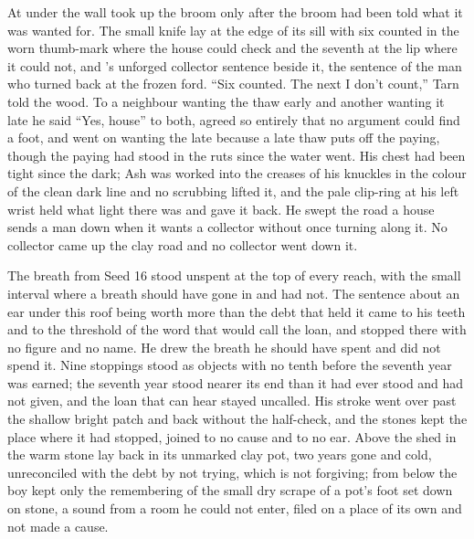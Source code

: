 At  under the wall  took up the broom only after the broom had been told what it was wanted for. The small knife lay at the edge of its sill with six counted in the worn thumb-mark where the house could check and the seventh at the lip where it could not, and 's unforged collector sentence beside it, the sentence of the man who turned back at the frozen ford. “Six counted. The next I don't count,” Tarn told the wood. To a neighbour wanting the thaw early and another wanting it late he said “Yes, house” to both, agreed so entirely that no argument could find a foot, and went on wanting the late because a late thaw puts off the paying, though the paying had stood in the ruts since the water went. His chest had been tight since the dark; Ash was worked into the creases of his knuckles in the colour of the clean dark line and no scrubbing lifted it, and the pale clip-ring at his left wrist held what light there was and gave it back. He swept the road a house sends a man down when it wants a collector without once turning along it. No collector came up the clay road and no collector went down it.

The breath from Seed 16 stood unspent at the top of every reach, with the small interval where a breath should have gone in and had not. The sentence about an ear under this roof being worth more than the debt that held it came to his teeth and to the threshold of the word that would call the loan, and stopped there with no figure and no name. He drew the breath he should have spent and did not spend it. Nine stoppings stood as objects with no tenth before the seventh year was earned; the seventh year stood nearer its end than it had ever stood and had not given, and the loan that can hear stayed uncalled. His stroke went over  past the shallow bright patch and back without the half-check, and the stones kept the place where it had stopped, joined to no cause and to no ear. Above the shed in  the warm stone lay back in its unmarked clay pot, two years gone and cold, unreconciled with the debt by not trying, which is not forgiving; from below the boy kept only the remembering of the small dry scrape of a pot's foot set down on stone, a sound from a room he could not enter, filed on a place of its own and not made a cause.

